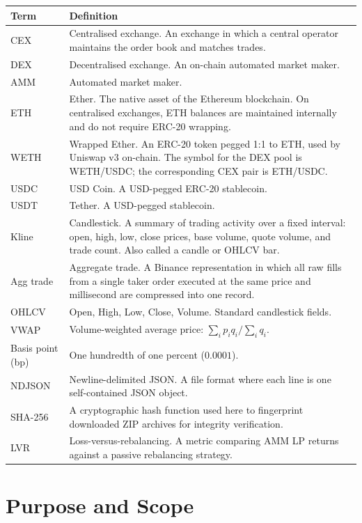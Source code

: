 \documentclass[11pt,a4paper]{article}
\begin{document}
\begin{xltabular}{\linewidth}{L{3.0cm}Y}
\toprule
\textbf{Term} & \textbf{Definition} \\
\midrule
CEX & Centralised exchange. An exchange in which a central operator
     maintains the order book and matches trades. \\
DEX & Decentralised exchange. An on-chain automated market maker. \\
AMM & Automated market maker. \\
ETH & Ether. The native asset of the Ethereum blockchain. On centralised
     exchanges, ETH balances are maintained internally and do not require
     ERC-20 wrapping. \\
WETH & Wrapped Ether. An ERC-20 token pegged 1:1 to ETH, used by Uniswap
      v3 on-chain. The symbol for the DEX pool is WETH/USDC; the
      corresponding CEX pair is ETH/USDC. \\
USDC & USD Coin. A USD-pegged ERC-20 stablecoin. \\
USDT & Tether. A USD-pegged stablecoin. \\
Kline & Candlestick. A summary of trading activity over a fixed interval:
        open, high, low, close prices, base volume, quote volume, and
        trade count. Also called a candle or OHLCV bar. \\
Agg trade & Aggregate trade. A Binance representation in which all raw
            fills from a single taker order executed at the same price and
            millisecond are compressed into one record. \\
OHLCV & Open, High, Low, Close, Volume. Standard candlestick fields. \\
VWAP & Volume-weighted average price: $\sum_i p_i q_i / \sum_i q_i$. \\
Basis point (bp) & One hundredth of one percent ($0.0001$). \\
NDJSON & Newline-delimited JSON. A file format where each line is one
         self-contained JSON object. \\
SHA-256 & A cryptographic hash function used here to fingerprint
          downloaded ZIP archives for integrity verification. \\
LVR & Loss-versus-rebalancing. A metric comparing AMM LP returns against
      a passive rebalancing strategy. \\
\bottomrule
\end{xltabular}

\section{Purpose and Scope}
\label{sec:purpose}
\end{document}
